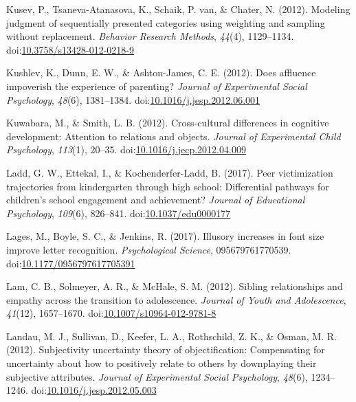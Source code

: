 \documentclass[english,man]{apa6}
\theoremstyle{definition}
\theoremstyle{definition}
\theoremstyle{definition}
\theoremstyle{remark}
\begin{document}
\hypertarget{ref-Kusev2012}{}
Kusev, P., Tsaneva-Atanasova, K., Schaik, P. van, \& Chater, N. (2012).
Modeling judgment of sequentially presented categories using weighting
and sampling without replacement. \emph{Behavior Research Methods},
\emph{44}(4), 1129--1134.
doi:\href{https://doi.org/10.3758/s13428-012-0218-9}{10.3758/s13428-012-0218-9}

\hypertarget{ref-Kushlev2012}{}
Kushlev, K., Dunn, E. W., \& Ashton-James, C. E. (2012). Does affluence
impoverish the experience of parenting? \emph{Journal of Experimental
Social Psychology}, \emph{48}(6), 1381--1384.
doi:\href{https://doi.org/10.1016/j.jesp.2012.06.001}{10.1016/j.jesp.2012.06.001}

\hypertarget{ref-Kuwabara2012}{}
Kuwabara, M., \& Smith, L. B. (2012). Cross-cultural differences in
cognitive development: Attention to relations and objects. \emph{Journal
of Experimental Child Psychology}, \emph{113}(1), 20--35.
doi:\href{https://doi.org/10.1016/j.jecp.2012.04.009}{10.1016/j.jecp.2012.04.009}

\hypertarget{ref-Ladd2017}{}
Ladd, G. W., Ettekal, I., \& Kochenderfer-Ladd, B. (2017). Peer
victimization trajectories from kindergarten through high school:
Differential pathways for children's school engagement and achievement?
\emph{Journal of Educational Psychology}, \emph{109}(6), 826--841.
doi:\href{https://doi.org/10.1037/edu0000177}{10.1037/edu0000177}

\hypertarget{ref-Lages2017}{}
Lages, M., Boyle, S. C., \& Jenkins, R. (2017). Illusory increases in
font size improve letter recognition. \emph{Psychological Science},
095679761770539.
doi:\href{https://doi.org/10.1177/0956797617705391}{10.1177/0956797617705391}

\hypertarget{ref-Lam2012}{}
Lam, C. B., Solmeyer, A. R., \& McHale, S. M. (2012). Sibling
relationships and empathy across the transition to adolescence.
\emph{Journal of Youth and Adolescence}, \emph{41}(12), 1657--1670.
doi:\href{https://doi.org/10.1007/s10964-012-9781-8}{10.1007/s10964-012-9781-8}

\hypertarget{ref-Landau2012}{}
Landau, M. J., Sullivan, D., Keefer, L. A., Rothschild, Z. K., \& Osman,
M. R. (2012). Subjectivity uncertainty theory of objectification:
Compensating for uncertainty about how to positively relate to others by
downplaying their subjective attributes. \emph{Journal of Experimental
Social Psychology}, \emph{48}(6), 1234--1246.
doi:\href{https://doi.org/10.1016/j.jesp.2012.05.003}{10.1016/j.jesp.2012.05.003}
\end{document}
